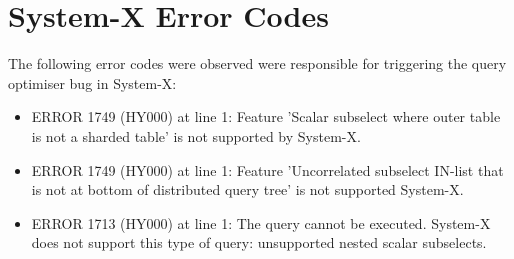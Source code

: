\chapter{System-X Error Codes}
\label{appendix:6}

The following error codes were observed were responsible for triggering the query optimiser bug in System-X:
\begin{itemize}
    \item ERROR 1749 (HY000) at line 1: Feature 'Scalar subselect where outer table is not a sharded table' is not supported by System-X.
    \item ERROR 1749 (HY000) at line 1: Feature 'Uncorrelated subselect IN-list that is not at bottom of distributed query tree' is not supported System-X.
    \item ERROR 1713 (HY000) at line 1: The query cannot be executed. System-X does not support this type of query: unsupported nested scalar subselects.
\end{itemize}